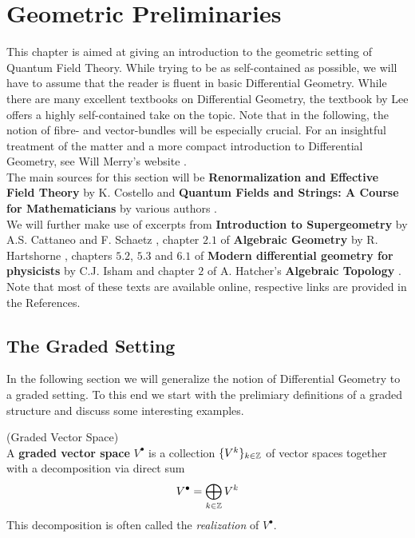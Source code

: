 \section{Geometric Preliminaries}
\label{sec:Geometric_Preliminaries}

This chapter is aimed at giving an introduction to the geometric setting of Quantum Field Theory. While trying to be as self-contained as possible, we will have to assume that the reader is fluent in basic Differential Geometry. While there are many excellent textbooks on Differential Geometry, the textbook by Lee  offers a highly self-contained take on the topic. Note that in the following, the notion of fibre- and vector-bundles will be especially crucial. For an insightful treatment of the matter and a more compact introduction to Differential Geometry, see Will Merry's website .\\

The main sources for this section will be \textbf{Renormalization and Effective Field Theory} by K. Costello  and \textbf{Quantum Fields and Strings:  A Course for Mathematicians} by various authors .\\

We will further make use of excerpts from \textbf{Introduction to Supergeometry} by A.S. Cattaneo and F. Schaetz , chapter $2.1$ of \textbf{Algebraic Geometry} by R. Hartshorne , chapters $5.2$, $5.3$ and $6.1$ of \textbf{Modern differential geometry for physicists} by C.J. Isham  and chapter $2$ of A. Hatcher's \textbf{Algebraic Topology} . Note that most of these texts are available online, respective links are provided in the References.

\subsection{The Graded Setting}

In the following section we will generalize the notion of Differential Geometry to a graded setting. To this end we start with the prelimiary definitions of a graded structure and discuss some interesting examples.

\begin{definition} (Graded Vector Space)\\
  A \textbf{graded vector space} $V^\bullet$ is a collection $\{ V^k \}_{k\in\mathbb{Z}}$ of vector spaces together with a decomposition via direct sum
  $$ V^\bullet = \bigoplus_{k\in\mathbb{Z}} V^k $$
  This decomposition is often called the \textit{realization} of $V^\bullet$.
\end{definition}

